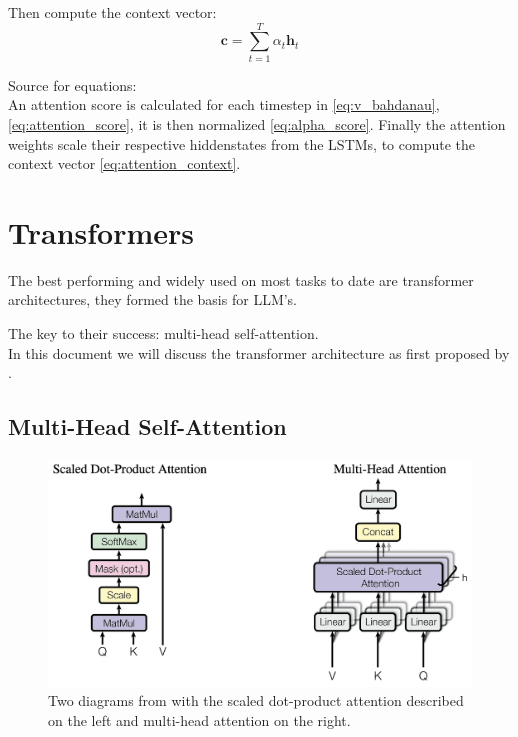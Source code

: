 \documentclass{article}
\begin{document}
Then compute the context vector:
\begin{equation}
    \mathbf{c} = \sum_{t=1}^{T} \alpha_t \mathbf{h}_t \label{eq:attention_context}
\end{equation}

Source for equations: \cite{cristina_2023_bahdanau}
\\[2em]
An attention score is calculated for each timestep in \eqref{eq:v_bahdanau}, 
\eqref{eq:attention_score}, it is then normalized \eqref{eq:alpha_score}. 
Finally the attention weights scale their respective hiddenstates from the 
LSTMs, to compute the context vector \eqref{eq:attention_context}.

\section{Transformers}

The best performing and widely used on most tasks to date are transformer 
architectures, they formed the basis for LLM's.

The key to their success: multi-head self-attention.
\\[2em]
In this document we will discuss the transformer architecture as first proposed 
by \cite{vaswani2023attentionneed}.
\subsection{Multi-Head Self-Attention}

\begin{figure}[htbp]
    \centering
    \includegraphics[width=0.5\paperwidth]{images/dotproduct_1.png}
    \caption{Two diagrams from \cite{vaswani2023attentionneed} with the scaled 
    dot-product attention described on the left and multi-head attention on the 
    right.}
    \label{fig:MHAttention}
\end{figure}
\end{document}
